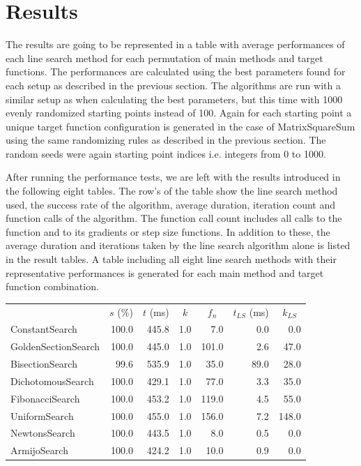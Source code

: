 \documentclass[a4paper,english,titlepage,12pt]{article}
\begin{document}
\section{Results}

The results are going to be represented in a table with average performances of each line search method for each permutation of main methods and target functions. The performances are calculated using the best parameters found for each setup as described in the previous section. The algorithms are run with a similar setup as when calculating the best parameters, but this time with 1000 evenly randomized starting points instead of 100. Again for each starting point a unique target function configuration is generated in the case of MatrixSquareSum using the same randomizing rules as described in the previous section. The random seeds were again starting point indices i.e. integers from 0 to 1000.

After running the performance tests, we are left with the results introduced in the following eight tables. The row's of the table show the line search method used, the success rate of the algorithm, average duration, iteration count and function calls of the algorithm. The function call count includes all calls to the function and to its gradients or step size functions. In addition to these, the average duration and iterations taken by the line search algorithm alone is listed in the result tables. A table including all eight line search methods with their representative performances is generated for each main method and target function combination.


\begin{center}
\label{tab:performance_results_MSS_NM}
\begin{tabular}{|l|r|r|r|r|r|r|}
\hline
\rowcolor{gray!25}
\multicolumn{1}{|c|}{Line Search Name} & \multicolumn{1}{c|}{$s$ (\%)} & \multicolumn{1}{c|}{$t$ (ms)} & \multicolumn{1}{c|}{$k$} & \multicolumn{1}{c|}{$f_n$} & \multicolumn{1}{c|}{$t_{LS}$ (ms)} & \multicolumn{1}{c|}{$k_{LS}$} \\
ConstantSearch & 100.0 & 445.8 & 1.0 & 7.0 & 0.0 & 0.0 \\
GoldenSectionSearch & 100.0 & 445.0 & 1.0 & 101.0 & 2.6 & 47.0 \\
BisectionSearch & 99.6 & 535.9 & 1.0 & 35.0 & 89.0 & 28.0 \\
DichotomousSearch & 100.0 & 429.1 & 1.0 & 77.0 & 3.3 & 35.0 \\
FibonacciSearch & 100.0 & 453.2 & 1.0 & 119.0 & 4.5 & 55.0 \\
UniformSearch & 100.0 & 455.0 & 1.0 & 156.0 & 7.2 & 148.0 \\
NewtonsSearch & 100.0 & 443.5 & 1.0 & 8.0 & 0.5 & 0.0 \\
ArmijoSearch & 100.0 & 424.2 & 1.0 & 10.0 & 0.9 & 0.0 \\
\hline
\end{tabular}
\end{center}
\end{document}
